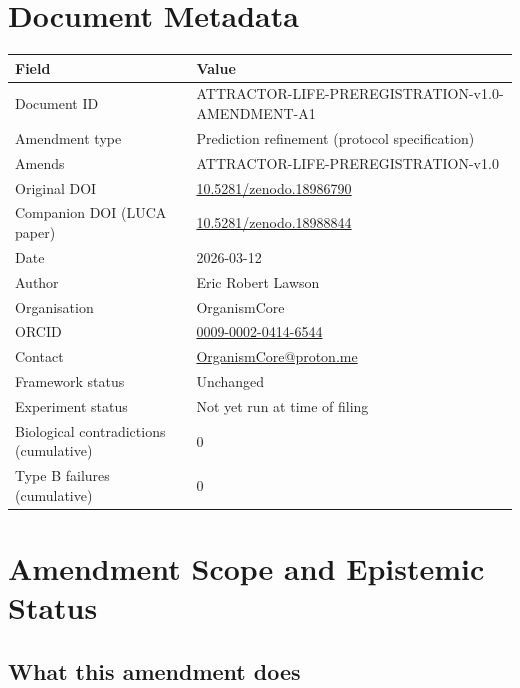 \documentclass[12pt, a4paper]{article}
\theoremstyle{definition}
\theoremstyle{remark}
\begin{document}
\newpage
\tableofcontents
\newpage

\section{Document Metadata}

\begin{center}
\begin{tabular}{ll}
\toprule
\textbf{Field} & \textbf{Value} \\
\midrule
Document ID
  & ATTRACTOR-LIFE-PREREGISTRATION-v1.0-AMENDMENT-A1 \\
Amendment type
  & Prediction refinement (protocol specification) \\
Amends
  & ATTRACTOR-LIFE-PREREGISTRATION-v1.0 \\
Original DOI
  & \href{https://doi.org/10.5281/zenodo.18986790}
         {10.5281/zenodo.18986790} \\
Companion DOI (LUCA paper)
  & \href{https://doi.org/10.5281/zenodo.18988844}
         {10.5281/zenodo.18988844} \\
Date
  & 2026-03-12 \\
Author
  & Eric Robert Lawson \\
Organisation
  & OrganismCore \\
ORCID
  & \href{https://orcid.org/0009-0002-0414-6544}
         {0009-0002-0414-6544} \\
Contact
  & \href{mailto:OrganismCore@proton.me}
         {OrganismCore@proton.me} \\
Framework status
  & Unchanged \\
Experiment status
  & Not yet run at time of filing \\
Biological contradictions (cumulative)
  & 0 \\
Type B failures (cumulative)
  & 0 \\
\bottomrule
\end{tabular}
\end{center}

\section{Amendment Scope and Epistemic Status}

\subsection{What this amendment does}
\end{document}

